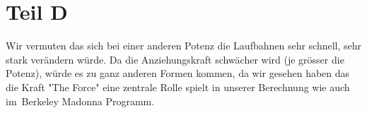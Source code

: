 \documentclass{article}
\begin{document}
	\section*{Teil D}
	Wir vermuten das sich bei einer anderen Potenz die Laufbahnen sehr schnell, sehr stark verändern würde. Da die Anziehungskraft schwächer wird (je grösser die Potenz), würde es zu ganz anderen Formen kommen, da wir gesehen haben das die Kraft "The Force" eine zentrale Rolle spielt in unserer Berechnung wie auch im Berkeley Madonna Programm.

	
	
\end{document}
